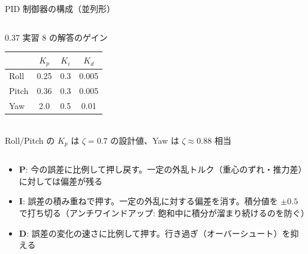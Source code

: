 \begin{frame}{PID 制御器の構成（並列形）}
\begin{columns}[c]
\begin{column}{0.37\textwidth}
      \vspace{0.3em}
      \centering\scriptsize
      実習 8 の解答のゲイン\\[1pt]
      \begin{tabular}{lccc}
        \hline
        & $K_p$ & $K_i$ & $K_d$ \\
        \hline
        Roll  & 0.25 & 0.3 & 0.005 \\
        Pitch & 0.36 & 0.3 & 0.005 \\
        Yaw   & 2.0  & 0.5 & 0.01 \\
        \hline
      \end{tabular}\\[1pt]
      Roll/Pitch の $K_p$ は $\zeta=0.7$ の設計値、Yaw は $\zeta\approx0.88$ 相当
    \end{column}
  \end{columns}

  \vspace{0.3em}
  \begin{itemize}\footnotesize\setlength{\itemsep}{1pt}
    \item \textbf{P}: 今の誤差に比例して押し戻す。一定の外乱トルク（重心のずれ・推力差）に対しては偏差が残る
    \item \textbf{I}: 誤差の積み重ねで押す。一定の外乱に対する偏差を消す。積分値を $\pm0.5$ で打ち切る（アンチワインドアップ: 飽和中に積分が溜まり続けるのを防ぐ）
    \item \textbf{D}: 誤差の変化の速さに比例して押す。行き過ぎ（オーバーシュート）を抑える
  \end{itemize}
\end{frame}

